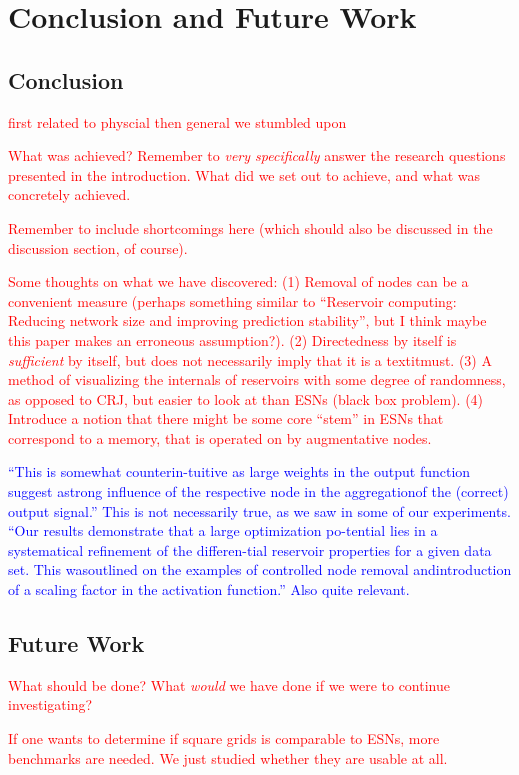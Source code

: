 \chapter{Conclusion and Future Work}
\label{ch:conclusion}

\section{Conclusion}

\textcolor{red}{
  first related to physcial then general we stumbled upon
}

\textcolor{red}{
  What was achieved? Remember to \textit{very specifically} answer the research
questions presented in the introduction. What did we set out to achieve, and
what was concretely achieved.
}

\textcolor{red}{
  Remember to include shortcomings here (which should also be discussed in the
discussion section, of course).
}

\textcolor{red}{
  Some thoughts on what we have discovered: (1) Removal of nodes can be a
convenient measure (perhaps something similar to ``Reservoir computing: Reducing
network size and improving prediction stability'', but I think maybe this paper
makes an erroneous assumption?). (2) Directedness by itself is
\textit{sufficient} by itself, but does not necessarily imply that it is a
textit{must}. (3) A method of visualizing the internals of reservoirs with some
degree of randomness, as opposed to CRJ, but easier to look at than ESNs (black
box problem). (4) Introduce a notion that there might be some core ``stem'' in
ESNs that correspond to a memory, that is operated on by augmentative nodes.
}

\textcolor{blue}{
  ``This is somewhat counterin-tuitive as large weights in the output function
suggest astrong influence of the respective node in the aggregationof the
(correct) output signal.'' This is not necessarily true, as we saw in some of
our experiments. ``Our results demonstrate that a large optimization po-tential
lies in a systematical refinement of the differen-tial reservoir properties for
a given data set.  This wasoutlined on the examples of controlled node removal
andintroduction of a scaling factor in the activation function.'' Also quite
relevant.
}

\section{Future Work}

\textcolor{red}{
  What should be done? What \textit{would} we have done if we were to continue
investigating?
}

\textcolor{red}{
  If one wants to determine if square grids is comparable to ESNs, more
benchmarks are needed. We just studied whether they are usable at all.
}

